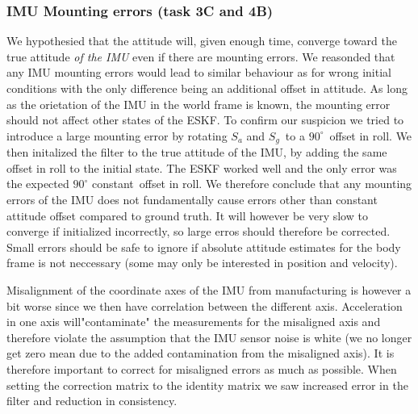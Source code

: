 \subsubsection{IMU Mounting errors (task 3C and 4B)}
We hypothesied that the attitude will, given enough time, converge toward the true attitude \textit{of the IMU} even if there are mounting errors. We reasonded that any IMU mounting errors would lead to similar behaviour as for wrong initial conditions with the only difference being an additional offset in attitude. As long as the orietation of the IMU in the world frame is known, the mounting error should not affect other states of the ESKF. 
To confirm our suspicion we tried to introduce a large mounting error by rotating $S_a$ and $S_g$ to a $90^\circ$ offset in roll. We then initalized the filter to the true attitude of the IMU, by adding the same offset in roll to the initial state.
The ESKF worked well and the only error was the expected $90^\circ$ constant offset in roll. We therefore conclude that any mounting errors of the IMU does not fundamentally cause errors other than constant attitude offset compared to ground truth. It will however be very slow to converge if initialized incorrectly, so large erros should therefore be corrected. Small errors should be safe to ignore if absolute attitude estimates for the body frame is not neccessary (some may only be interested in position and velocity).   

Misalignment of the coordinate axes of the IMU from manufacturing is however a bit worse since we then have correlation between the different axis. Acceleration in one axis will"contaminate" the measurements for the misaligned axis and therefore violate the assumption that the IMU sensor noise is white (we no longer get zero mean due to the added contamination from the misaligned axis). It is therefore important to correct for misaligned errors as much as possible. When setting the correction matrix to the identity matrix we saw increased error in the filter and reduction in consistency.  




